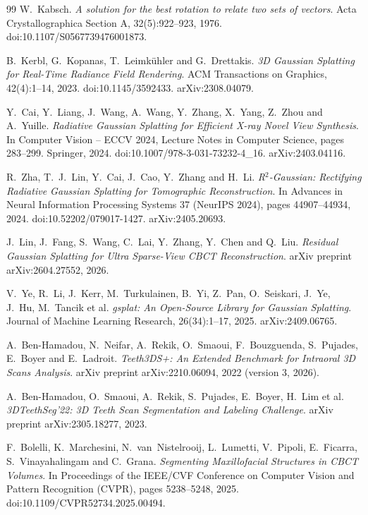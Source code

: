 \documentclass[11pt,a4paper]{article}
\begin{document}
\begin{thebibliography}{99}
W.~Kabsch.
\emph{A solution for the best rotation to relate two sets of vectors}.
Acta Crystallographica Section A, 32(5):922--923, 1976. doi:10.1107/S0567739476001873.

B.~Kerbl, G.~Kopanas, T.~Leimkühler and G.~Drettakis.
\emph{3D Gaussian Splatting for Real-Time Radiance Field Rendering}.
ACM Transactions on Graphics, 42(4):1--14, 2023. doi:10.1145/3592433. arXiv:2308.04079.

Y.~Cai, Y.~Liang, J.~Wang, A.~Wang, Y.~Zhang, X.~Yang, Z.~Zhou and A.~Yuille.
\emph{Radiative Gaussian Splatting for Efficient X-ray Novel View Synthesis}.
In Computer Vision -- ECCV 2024, Lecture Notes in Computer Science, pages 283--299.
Springer, 2024. doi:10.1007/978-3-031-73232-4\_16. arXiv:2403.04116.

R.~Zha, T.~J.~Lin, Y.~Cai, J.~Cao, Y.~Zhang and H.~Li.
\emph{R$^2$-Gaussian: Rectifying Radiative Gaussian Splatting for Tomographic
Reconstruction}.
In Advances in Neural Information Processing Systems 37 (NeurIPS 2024), pages
44907--44934, 2024. doi:10.52202/079017-1427. arXiv:2405.20693.

J.~Lin, J.~Fang, S.~Wang, C.~Lai, Y.~Zhang, Y.~Chen and Q.~Liu.
\emph{Residual Gaussian Splatting for Ultra Sparse-View CBCT Reconstruction}.
arXiv preprint arXiv:2604.27552, 2026.

V.~Ye, R.~Li, J.~Kerr, M.~Turkulainen, B.~Yi, Z.~Pan, O.~Seiskari, J.~Ye, J.~Hu,
M.~Tancik et al.
\emph{gsplat: An Open-Source Library for Gaussian Splatting}.
Journal of Machine Learning Research, 26(34):1--17, 2025. arXiv:2409.06765.

A.~Ben-Hamadou, N.~Neifar, A.~Rekik, O.~Smaoui, F.~Bouzguenda, S.~Pujades, E.~Boyer and
E.~Ladroit.
\emph{Teeth3DS+: An Extended Benchmark for Intraoral 3D Scans Analysis}.
arXiv preprint arXiv:2210.06094, 2022 (version 3, 2026).

A.~Ben-Hamadou, O.~Smaoui, A.~Rekik, S.~Pujades, E.~Boyer, H.~Lim et al.
\emph{3DTeethSeg'22: 3D Teeth Scan Segmentation and Labeling Challenge}.
arXiv preprint arXiv:2305.18277, 2023.

F.~Bolelli, K.~Marchesini, N.~van~Nistelrooij, L.~Lumetti, V.~Pipoli, E.~Ficarra,
S.~Vinayahalingam and C.~Grana.
\emph{Segmenting Maxillofacial Structures in CBCT Volumes}.
In Proceedings of the IEEE/CVF Conference on Computer Vision and Pattern Recognition
(CVPR), pages 5238--5248, 2025. doi:10.1109/CVPR52734.2025.00494.


\end{thebibliography}
\end{document}
